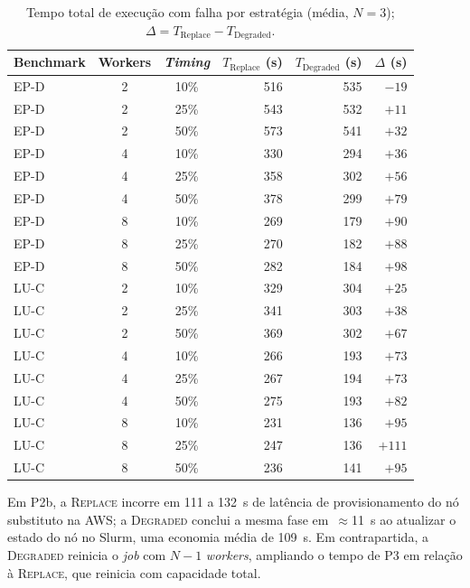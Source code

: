 \begin{table}[htb]
  \caption{Tempo total de execução com falha por estratégia (média, $N=3$);
           $\Delta = T_{\text{Replace}} - T_{\text{Degraded}}$.}
  \label{tab:strategy-wall-time}
  \centering
  \small
  \begin{tabular}{l c c r r r}
    \toprule
    Benchmark & Workers & \textit{Timing} &
      $T_{\text{Replace}}$ (s) & $T_{\text{Degraded}}$ (s) & $\Delta$ (s) \\
    \midrule
    EP-D & 2 & 10\% & 516 & 535 & $-19$ \\
    EP-D & 2 & 25\% & 543 & 532 & $+11$ \\
    EP-D & 2 & 50\% & 573 & 541 & $+32$ \\
    \addlinespace
    EP-D & 4 & 10\% & 330 & 294 & $+36$ \\
    EP-D & 4 & 25\% & 358 & 302 & $+56$ \\
    EP-D & 4 & 50\% & 378 & 299 & $+79$ \\
    \addlinespace
    EP-D & 8 & 10\% & 269 & 179 & $+90$ \\
    EP-D & 8 & 25\% & 270 & 182 & $+88$ \\
    EP-D & 8 & 50\% & 282 & 184 & $+98$ \\
    \midrule
    LU-C & 2 & 10\% & 329 & 304 & $+25$ \\
    LU-C & 2 & 25\% & 341 & 303 & $+38$ \\
    LU-C & 2 & 50\% & 369 & 302 & $+67$ \\
    \addlinespace
    LU-C & 4 & 10\% & 266 & 193 & $+73$ \\
    LU-C & 4 & 25\% & 267 & 194 & $+73$ \\
    LU-C & 4 & 50\% & 275 & 193 & $+82$ \\
    \addlinespace
    LU-C & 8 & 10\% & 231 & 136 & $+95$ \\
    LU-C & 8 & 25\% & 247 & 136 & $+111$ \\
    LU-C & 8 & 50\% & 236 & 141 & $+95$ \\
    \bottomrule
  \end{tabular}
\end{table}

Em P2b, a \textsc{Replace} incorre em 111 a 132~s de latência de provisionamento
do nó substituto na AWS; a \textsc{Degraded} conclui a mesma fase em~$\approx$11~s
ao atualizar o estado do nó no Slurm, uma economia média de 109~s. Em contrapartida,
a \textsc{Degraded} reinicia o \textit{job} com $N{-}1$ \textit{workers}, ampliando
o tempo de P3 em relação à \textsc{Replace}, que reinicia com capacidade total.

